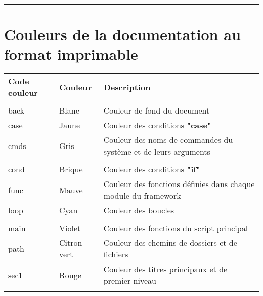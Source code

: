 \documentclass[a4paper,10pt]{article}
\begin{document}
  \newpage





  \color{sec1}\par\noindent\rule{\textwidth}{0.4pt}\color{text}

  \color{red}
  \section{Couleurs de la documentation au format imprimable}\color{text}

  \begin{justify}
      \begin{tabular}{lll}
          \textbf{Code couleur} & \textbf{Couleur}    & \textbf{Description}\\\\

          \color{text}back  & \color{text}Blanc       & \color{text}Couleur de fond du document\\
          \color{case}case  & \color{case}Jaune       & \color{case}Couleur des conditions \textbf{"case"}\\
          \color{cmds}cmds  & \color{cmds}Gris        & \color{cmds}Couleur des noms de commandes du système et de leurs arguments\\\\

          \color{cond}cond  & \color{cond}Brique      & \color{cond}Couleur des conditions \textbf{"if"}\\
          \color{func}func  & \color{func}Mauve       & \color{func}Couleur des fonctions définies dans chaque module du framework\\
          \color{loop}loop  & \color{loop}Cyan        & \color{loop}Couleur des boucles\\\\

          \color{main}main  & \color{main}Violet      & \color{main}Couleur des fonctions du script principal\\
          \color{path}path  & \color{path}Citron vert & \color{path}Couleur des chemins de dossiers et de fichiers\\
          \color{sec1}sec1  & \color{sec1}Rouge       & \color{sec1}Couleur des titres principaux et de premier niveau\\\\


\end{tabular}
\end{justify}
\end{document}
